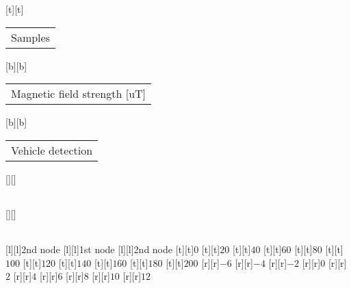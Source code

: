 %
[t][t]{\fontsize{8}{12}\selectfont \setlength{\tabcolsep}{0pt}\begin{tabular}{c}Samples\end{tabular}}%
[b][b]{\fontsize{8}{12}\selectfont \setlength{\tabcolsep}{0pt}\begin{tabular}{c}Magnetic field strength [uT]\end{tabular}}%
[b][b]{\fontsize{8}{12}\selectfont \setlength{\tabcolsep}{0pt}\begin{tabular}{c}Vehicle detection\end{tabular}}%
[][]{\fontsize{8}{12}\selectfont \setlength{\tabcolsep}{0pt}\begin{tabular}{c} \end{tabular}}%
[][]{\fontsize{8}{12}\selectfont \setlength{\tabcolsep}{0pt}\begin{tabular}{c} \end{tabular}}%
[l][l]{\fontsize{6}{8}\selectfont 2nd node}%
[l][l]{\fontsize{6}{8}\selectfont 1st node}%
[l][l]{\fontsize{6}{8}\selectfont 2nd node}%
%
\fontsize{6}{8}%
\selectfont%
%
[t][t]{$0$}%
[t][t]{$20$}%
[t][t]{$40$}%
[t][t]{$60$}%
[t][t]{$80$}%
[t][t]{$100$}%
[t][t]{$120$}%
[t][t]{$140$}%
[t][t]{$160$}%
[t][t]{$180$}%
[t][t]{$200$}%
%
[r][r]{$-6$}%
[r][r]{$-4$}%
[r][r]{$-2$}%
[r][r]{$0$}%
[r][r]{$2$}%
[r][r]{$4$}%
[r][r]{$6$}%
[r][r]{$8$}%
[r][r]{$10$}%
[r][r]{$12$}%
%
%
